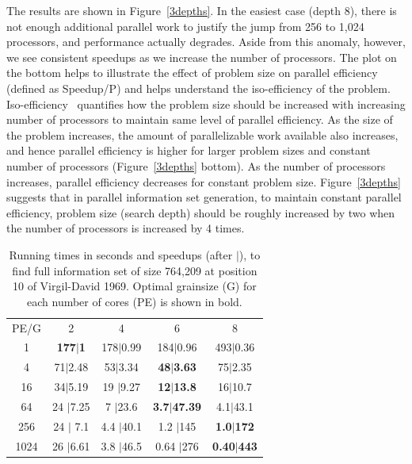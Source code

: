 \documentclass[10pt, conference, compsocconf]{IEEEtran}
\begin{document}
The results are shown in Figure~\ref{3depths}.  In the easiest case (depth 8),
there is not enough additional parallel work to justify the jump from 256 to
1,024 processors, and performance actually degrades.  Aside from this anomaly,
however, we see consistent speedups as we increase the number of processors. 
The plot on the bottom helps to illustrate the effect of problem size on parallel efficiency (defined as Speedup/P) and helps understand the iso-efficiency of the problem. Iso-efficiency~\cite{b:grama-isoefficiency} quantifies how the problem size should be increased with increasing number of processors to maintain same level of parallel efficiency. As the size of the problem increases, the amount of parallelizable work available also increases, and hence parallel efficiency is higher for larger problem sizes and constant number of processors (Figure~\ref{3depths} bottom). As the number of processors increases, parallel efficiency decreases for constant problem size. Figure~\ref{3depths} suggests that in parallel information set generation, to maintain constant parallel efficiency, problem size (search depth) should be roughly increased by two when the number of processors is increased by 4 times.

\begin{table}[ht]
\caption{Running times in seconds and speedups (after $|$), to find full
information set of size 764,209 at position 10 of Virgil-David 1969. Optimal
grainsize (G) for each number of cores (PE) is shown in bold.}


\centering
\begin{tabular}{ccccc}
PE/G & 2 & 4 & 6 & 8 \\
1 & {\bf 177$|$1} & 178$|$0.99 & 184$|$0.96 & 493$|$0.36 \\
4 & 71$|$2.48 & 53$|$3.34 & {\bf 48$|$3.63} & 75$|$2.35 \\
16 & 34$|$5.19 & 19 $|$9.27& {\bf 12$|$13.8} & 16$|$10.7 \\
64 & 24 $|$7.25 & 7 $|$23.6& {\bf 3.7$|$47.39} & 4.1$|$43.1 \\
256 & 24 $|$ 7.1& 4.4 $|$40.1 & 1.2 $|$145& {\bf 1.0$|$172} \\
1024 & 26 $|$6.61 & 3.8 $|$46.5& 0.64 $|$276& {\bf 0.40$|$443}
\end{tabular}

\label{tab:prob4}
\vspace{-0.1in}
\end{table}
\end{document}
